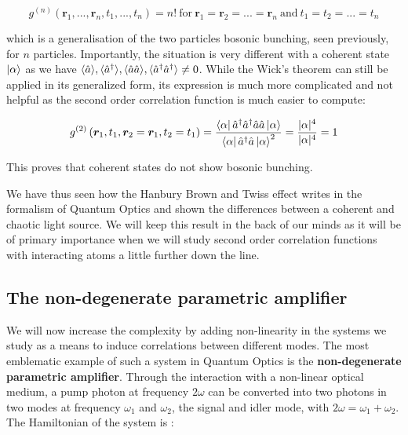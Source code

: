 \begin{equation}
    g^{(n)} (\bm{r}_1,...,\bm{r}_n,t_1,...,t_n) = n! \ \mathrm{for} \ \bm{r}_1=\bm{r}_2= ... =\bm{r}_n \ \mathrm{and} \ t_1=t_2=...=t_n
\end{equation}

\noindent which is a generalisation of the two particles bosonic bunching, seen previously, for $n$ particles. Importantly, the situation is very different with a coherent state $\ket{\alpha}$ as we have $\langle \hat{a} \rangle, \langle \hat{a}^{\dagger} \rangle, \langle\hat{a} \hat{a}\rangle, \langle \hat{a}^{\dagger} \hat{a}^{\dagger} \rangle \neq 0$. While the Wick's theorem can still be applied in its generalized form, its expression is much more complicated and not helpful as the second order correlation function is much easier to compute:


\begin{equation}
     g^{(2)}\left(\bm{r}_{1}, t_{1}, \bm{r}_{2}=\bm{r}_1, t_{2}=t_1\right) = \frac{\bra{\alpha} \hat{a}^{\dagger} \hat{a}^{\dagger} \hat{a} \hat{a} \ket{\alpha}} {\bra{\alpha} \hat{a}^{\dagger} \hat{a} \ket{\alpha}^{2}} = \frac{|\alpha|^4}{|\alpha|^4}=1
\end{equation}

\label{sec:coherent_g2}

\noindent This proves that coherent states do not show bosonic bunching.

We have thus seen how the Hanbury Brown and Twiss effect writes in the formalism of Quantum Optics and shown the differences between a coherent and chaotic light source. We will keep this result in the back of our minds as it will be of primary importance when we will study second order correlation functions with interacting atoms a little further down the line.

\subsection{The non-degenerate parametric amplifier}

\label{sec:amp_parametric}

We will now increase the complexity by adding non-linearity in the systems we study as a means to induce correlations between different modes. The most emblematic example of such a system in Quantum Optics is the \textbf{non-degenerate parametric amplifier}. Through the interaction with a non-linear optical medium, a pump photon at frequency $2 \omega$ can be converted into two photons in two modes at frequency $\omega_1$ and $\omega_2$, the signal and idler mode, with $2 \omega = \omega_1 + \omega_2$. The Hamiltonian of the system is \cite{walls2008}:

